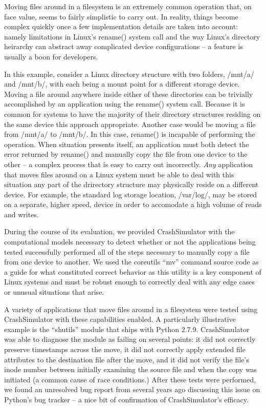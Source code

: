     Moving files around in a filesystem is an extremely common operation that, on face value, seems to fairly simplistic
    to carry out.  In reality, things become complex quickly once a few implementation details are taken into account:
    namely limitations in Linux's rename() system call and the way Linux's directory heirarchy can abstract away
    complicated device configurations -- a feature is usually a boon for developers.

    In this example, consider a Linux directory structure with two folders, /mnt/a/ and /mnt/b/, with each being a mount
    point for a different storage device.  Moving a file around anywhere inside either of these directories can be
    trivially accomplished by an application using the rename() system call.  Because it is common for systems to have
    the majority of their directory structures residing on the same device this approach appropriate.  Another case
    would be moving a file from /mnt/a/ to /mnt/b/.  In this case, rename() is incapable of performing the operation.
    When situation presents itself, an application must both detect the error returned by rename() and manually copy the
    file from one device to the other -- a complex process that is easy to carry out incorrectly.  \emph{Any}
    application that moves files around on a Linux system must be able to deal with this situation any part of the
    drirectory structure may physically reside on a different device.  For example, the standard log storage location,
    /var/log/, may be stored on a separate, higher speed, device in order to accomodate a high volume of reads and writes.

    During the course of its evaluation, we provided CrashSimulator with the computational models necessary to detect
    whether or not the applications being tested successfully performed all of the steps necessary to manually copy a
    file from one device to another.  We used the coreutils ``mv'' command source code as a guide for what constituted
    correct behavior as this utility is a key component of Linux systems and must be robust enough to correctly deal
    with any edge cases or unusual situations that arise.

    A variety of applications that move files around in a filesystem were tested using CrashSimulator with these
    capabilities enabled.  A particularly illustrative example is the ``shutils'' module that ships with Python 2.7.9.
    CrashSimulator was able to diagnose the module as failing on several points: it did not correctly preserve
    timestamps across the move, it did not correctly apply extended file attributes to the destination file after the
    move, and it did not verify the file's inode number between initially examining the source file and when the copy
    was initiated (a common cause of race conditions.)  After these tests were performed, we found an unresolved bug
    report from several years ago discussing this issue on Python's bug tracker -- a nice bit of confirmation of
    CrashSimulator's efficacy.

